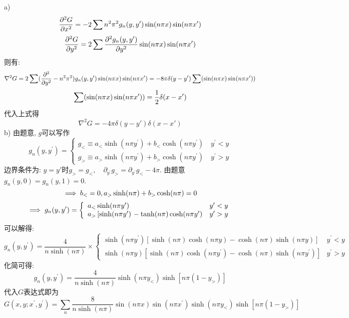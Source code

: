 \documentclass[UTF8,9pt]{ctexart}
\begin{document}
a)
$$\pp[2]{G}{x}=-2\sum n^2\pi^2g_n(y,y')\sin (n\pi x)\sin(n \pi x')$$
$$\pp[2]{G}{y}=2\sum \pp[2]{g_n(y,y')}{y}\sin (n\pi x)\sin(n \pi x')$$
则有:
$$\nabla^2G=2\sum(\pp[2]{}{y}-n^2\pi^2)g_n(y,y')\sin (n\pi x)\sin(n \pi x') = -8\pi\delta(y-y')\sum(\sin (n\pi x)\sin(n \pi x'))$$
$$\sum(\sin (n\pi x)\sin(n \pi x'))=\ff{2}\de(x-x')$$
代入上式得
$$\nabla^2G = -4\pi\delta(y-y')\delta(x-x')$$
b) 
由题意, $g$可以写作
$$ 
g_{n}(y, y^{\prime})=\left\{\begin{array}{l}{
    g_{<} \equiv a_{<} \sinh (n \pi y^{\prime})+b_{<} \cosh (n \pi y^{\prime}) \quad y^{\prime}<y} \\ 
{g_{>} \equiv a_{>} \sinh (n \pi y^{\prime})+b_{>} \cosh (n \pi y^{\prime})} \quad {y^{\prime}>y}
\end{array}\right.
 $$
边界条件为: $y=y'$时$g_{>}=g_{<}, \quad \partial_{y^{\prime}} g_{>}=\partial_{y^{\prime}} g_{<}-4 \pi$. 由题意$g_{n}(y, 0)=g_{n}(y, 1)=0$. 
$$\ip b_<=0, a_>\sinh(n\pi)+b_>\cosh(n\pi)=0$$
$$ \ip
g_{n}(y, y^{\prime})=\left\{\begin{array}{llr}{a_{<} \sinh (n \pi y^{\prime})} & {y^{\prime}<y} \\ {a_{>}\left[\sinh (n \pi y^{\prime})\right.-\tanh (n \pi) \cosh (n \pi y^{\prime})} & {y^{\prime}>y}\end{array}\right.
 $$
可以解得:
$$ 
g_{n}(y, y^{\prime})=\frac{4}{n \sinh (n \pi)}
\times \left\{\begin{array}{ll}{\sinh (n \pi y^{\prime})[\sinh (n \pi) \cosh (n \pi y)-\cosh (n \pi) \sinh (n \pi y)]} & {y^{\prime}<y} \\ {\sinh (n \pi y)\left[\sinh (n \pi) \cosh (n \pi y^{\prime})-\cosh (n \pi) \sinh (n \pi y^{\prime})\right]} & {y^{\prime}>y}\end{array}\right.
 $$
化简可得:
$$ 
g_{n}(y, y^{\prime})=\frac{4}{n \sinh (n \pi)} \sinh (n \pi y_{<}) \sinh \left[n \pi(1-y_{>})\right]
 $$
 代入$G$表达式即为
 $$ 
G(x, y ; x^{\prime}, y^{\prime})=\sum_{n} \frac{8}{n \sinh (n \pi)} \sin (n \pi x) \sin (n \pi x^{\prime}) \sinh (n \pi y_{<}) \sinh \left[n \pi(1-y_{>})\right]
 $$
 
\end{document}
